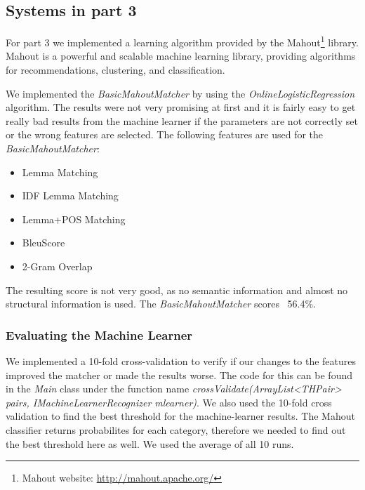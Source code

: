 \subsection{Systems in part 3}
For part 3 we implemented a learning algorithm provided by the Mahout\footnote{Mahout website:
\url{http://mahout.apache.org/}} library. Mahout is a powerful and scalable machine learning library, providing
algorithms for recommendations, clustering, and classification.

\pagebreak

We implemented the \textit{BasicMahoutMatcher} by using
the \textit{OnlineLogisticRegression} algorithm. The results were not very promising at first and it is fairly easy to
get really bad results from the machine learner if the parameters are not correctly set or the wrong features are
selected. The following features are used for the \textit{BasicMahoutMatcher}:


\begin{itemize}
    \item Lemma Matching
    \item IDF Lemma Matching
    \item Lemma+POS Matching
    \item BleuScore
    \item 2-Gram Overlap
\end{itemize}

The resulting score is not very good, as no semantic information and almost no structural information is used. The
\textit{BasicMahoutMatcher} scores ~56.4\%.

\subsubsection{Evaluating the Machine Learner}
We implemented a 10-fold cross-validation to verify if our changes to the features improved the matcher or made the
results worse. The code for this can be found in the \textit{Main} class under the function name
\textit{crossValidate(ArrayList<THPair> pairs, IMachineLearnerRecognizer mlearner)}. We also used the 10-fold cross
validation to find the best threshold for the machine-learner results. The Mahout classifier returns probabilites for
each category, therefore we needed to find out the best threshold here as well. We used the average of all 10 runs.


